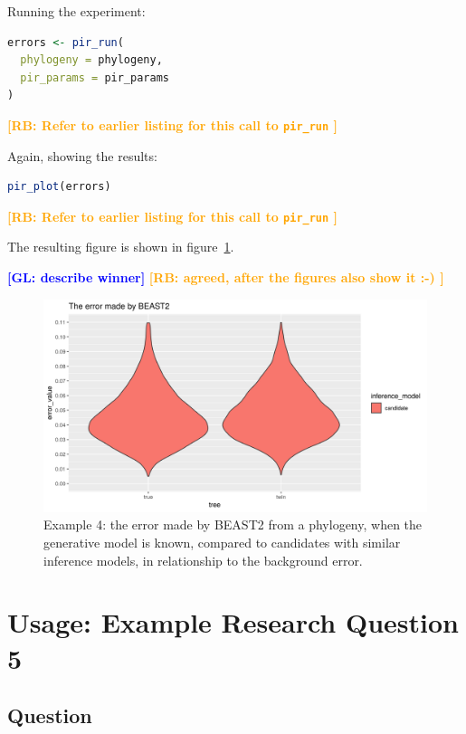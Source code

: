 \documentclass{article}
\newcommand{\giovanni}[1]{\textcolor{blue}{\textbf{[GL: #1]}}}
\newcommand{\richel}[1]{\textcolor{orange}{\textbf{[RB: #1]}}}
\begin{document}
Running the experiment:

\begin{lstlisting}[language=R, floatplacement=ht, frame=single]
errors <- pir_run(
  phylogeny = phylogeny,
  pir_params = pir_params
)
\end{lstlisting}
\richel{
  Refer to earlier listing for this call to \texttt{pir\_run}
}

Again, showing the results:

\begin{lstlisting}[language=R, floatplacement=ht, frame=single]
pir_plot(errors)
\end{lstlisting}
\richel{
  Refer to earlier listing for this call to \texttt{pir\_run}
}

The resulting figure is shown in figure~\ref{fig:example_4}.

\giovanni{describe winner}
\richel{agreed, after the figures also show it :-) }

\begin{figure}[ht]
  \includegraphics[width=\textwidth]{example_4_errors.png}
  \caption{
    Example 4: the error made by BEAST2 from a phylogeny, when the generative 
    model is known, compared to candidates with similar inference models, in 
    relationship to the background error.
  }
  \label{fig:example_4}
\end{figure}


\section{Usage: Example Research Question 5}

\subsection{Question}
\end{document}
